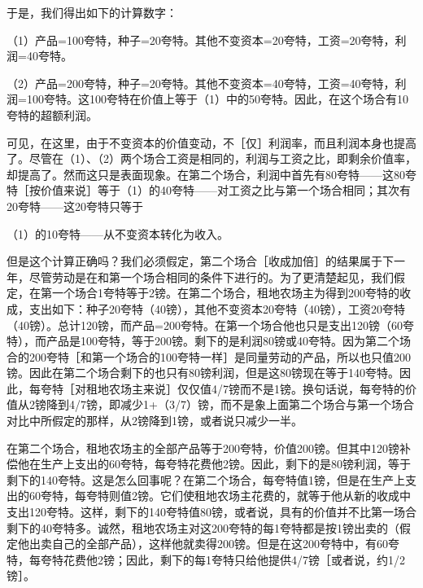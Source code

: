 于是，我们得出如下的计算数字：

（1）产品=100夸特，种子=20夸特。其他不变资本=20夸特，工资=20夸特，利润=40夸特。

（2）产品=200夸特，种子=20夸特。其他不变资本=40夸特，工资=40夸特，利润=100夸特。这100夸特在价值上等于（1）中的50夸特。因此，在这个场合有10夸特的超额利润。

可见，在这里，由于不变资本的价值变动，不［仅］利润率，而且利润本身也提高了。尽管在（1）、（2）两个场合工资是相同的，利润与工资之比，即剩余价值率，却提高了。然而这只是表面现象。在第二个场合，利润中首先有80夸特——这80夸特［按价值来说］等于（1）的40夸特——对工资之比与第一个场合相同；其次有20夸特——这20夸特只等于

（1）的10夸特——从不变资本转化为收入。

但是这个计算正确吗？我们必须假定，第二个场合［收成加倍］的结果属于下一年，尽管劳动是在和第一个场合相同的条件下进行的。为了更清楚起见，我们假定，在第一个场合1夸特等于2镑。在第二个场合，租地农场主为得到200夸特的收成，支出如下：种子20夸特（40镑），其他不变资本20夸特（40镑），工资20夸特（40镑）。总计120镑，而产品=200夸特。在第一个场合他也只是支出120镑（60夸特），而产品是100夸特，等于200镑。剩下的是利润80镑或40夸特。因为第二个场合的200夸特［和第一个场合的100夸特一样］是同量劳动的产品，所以也只值200镑。因此在第二个场合剩下的也只有80镑利润，但是这80镑现在等于140夸特。因此，每夸特［对租地农场主来说］仅仅值4/7镑而不是1镑。换句话说，每夸特的价值从2镑降到4/7镑，即减少1+（3/7）镑，而不是象上面第二个场合与第一个场合对比中所假定的那样，从2镑降到1镑，或者说只减少一半。

在第二个场合，租地农场主的全部产品等于200夸特，价值200镑。但其中120镑补偿他在生产上支出的60夸特，每夸特花费他2镑。因此，剩下的是80镑利润，等于剩下的140夸特。这是怎么回事呢？在第二个场合，每夸特值1镑，但是在生产上支出的60夸特，每夸特则值2镑。它们使租地农场主花费的，就等于他从新的收成中支出120夸特。这样，剩下的140夸特值80镑，或者说，具有的价值并不比第一场合剩下的40夸特多。诚然，租地农场主对这200夸特的每1夸特都是按1镑出卖的（假定他出卖自己的全部产品），这样他就卖得200镑。但是在这200夸特中，有60夸特，每夸特花费他2镑；因此，剩下的每1夸特只给他提供4/7镑［或者说，约1/2镑］。

